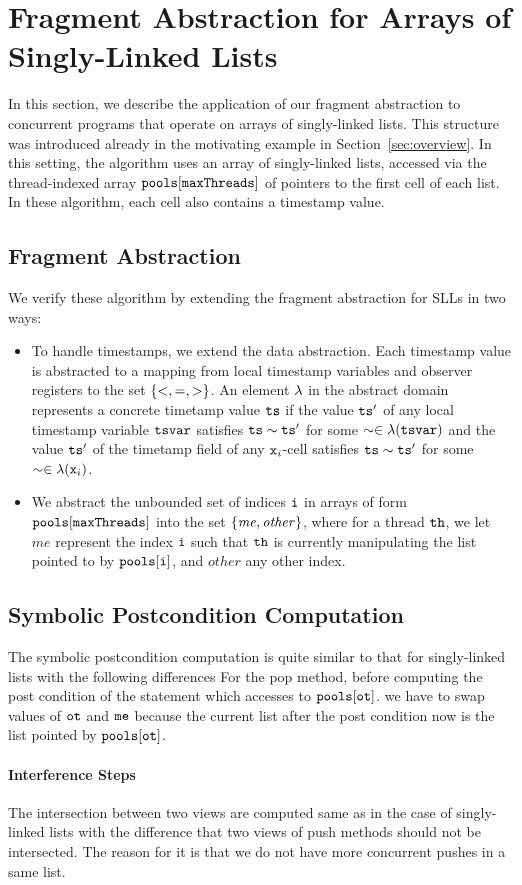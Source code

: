 \section{Fragment Abstraction for Arrays of Singly-Linked Lists}
In this section, we describe the application of our fragment abstraction to concurrent programs that operate on arrays of singly-linked lists. This structure
was introduced already in the motivating example in
Section~\ref{sec:overview}.
In this setting, the algorithm uses an array of singly-linked lists, accessed via the thread-indexed array ${\tt pools[maxThreads]}$ of pointers to the first cell of each list. In these algorithm, each cell also contains a timestamp value.

\subsection{Fragment Abstraction}
We verify these algorithm by extending the fragment abstraction for SLLs in
two ways:
\begin{itemize}
\item   To handle timestamps, we extend the data abstraction. Each timestamp value is abstracted to a mapping from local timestamp variables and observer
  registers to the set $\left\{<,=,>\right\}$.
  An element $\lambda$ in the abstract domain represents a concrete timetamp value $\tt ts$ if the value $\tt ts'$ of any local timestamp variable
  $\mathtt{tsvar}$ satisfies $\tt ts \sim ts'$ for some $\sim \in
  \lambda(\mathtt{tsvar})$ and the value $\tt ts'$ of the timetamp field
  of any $\mathtt{x}_i$-cell satisfies $\tt ts \sim ts'$ for some $\sim \in
  \lambda(\mathtt{x}_i)$.
\item
  We abstract the unbounded set of indices $\tt i$ in arrays of form
  $\tt pools[maxThreads]$ into the set $\left\{\mathit{me},\mathit{other}\right\}$, where
  for a thread ${\tt th}$, we let $\mathit{me}$ represent the index
  $\tt i$ such that ${\tt th}$ is currently manipulating the list pointed to
  by $\tt pools[i]$, and $\mathit{other}$ any other index.
\end{itemize}

\subsection{Symbolic Postcondition Computation}
The symbolic postcondition computation is quite similar to that for singly-linked lists with the following differences
For the pop method, before computing the post condition of the statement which accesses to $\tt pools[ot]$. we have to swap values of $\tt ot$ and $\tt me$ because the current list after the post condition now is the list pointed by $\tt pools[ot]$.  

\paragraph{Interference Steps} 
The intersection between two views are computed same as in the case of singly-linked lists with the difference that two views of push methods should not be intersected. The reason for it is that we do not have more concurrent pushes in a same list.








